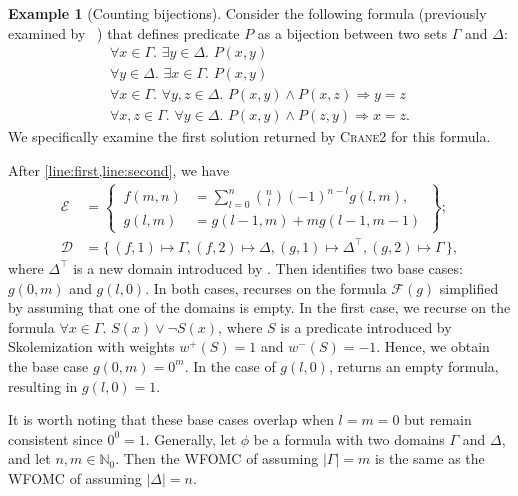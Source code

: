\documentclass[letterpaper]{article} %
\theoremstyle{remark}
\theoremstyle{definition}
\newtheorem{example}{Example}
\newcommand{\Cranetwo}{\textsc{Crane2}}
\begin{document}
\begin{example}[Counting bijections]\label{example:overall}
  Consider the following formula (previously examined by
  \citeauthor{DBLP:conf/kr/DilkasB23}~) that
  defines predicate $P$ as a bijection between two sets $\Gamma$ and $\Delta$:
  \[
    \begin{gathered}
      \forall x \in \Gamma\text{. }\exists y \in \Delta\text{. }P(x, y)\\
      \forall y \in \Delta\text{. }\exists x \in \Gamma\text{. }P(x, y)\\
      \forall x \in \Gamma\text{. }\forall y, z \in \Delta\text{. }P(x, y) \land P(x, z) \Rightarrow y = z\\
      \forall x, z \in \Gamma\text{. }\forall y \in \Delta\text{. }P(x, y) \land P(z, y) \Rightarrow x = z.
    \end{gathered}
  \]
  We specifically examine the first solution returned by \Cranetwo{} for this
  formula.

  After \cref{line:first,line:second}, we have
  \begin{align*}
    \mathcal{E} &= \left\{\,\begin{aligned}f(m, n) &= \sum_{l=0}^{n} \binom{n}{l}{(-1)}^{n-l}g(l, m),\\ g(l, m) &= g(l-1, m) + mg(l-1, m-1)\end{aligned}\,\right\};\\
    \mathcal{D} &= \{\, (f, 1) \mapsto \Gamma, (f, 2) \mapsto \Delta, (g, 1) \mapsto \Delta^{\top}, (g, 2) \mapsto \Gamma \,\},
  \end{align*}
  where $\Delta^{\top}$ is a new domain introduced by \Compile. Then
  \FindBaseCases identifies two base cases: $g(0, m)$ and $g(l, 0)$. In both
  cases, \CompileWithBaseCases recurses on the formula $\mathcal{F}(g)$
  simplified by assuming that one of the domains is empty. In the first case, we
  recurse on the formula $\forall x \in \Gamma\text{. }S(x) \lor \neg S(x)$,
  where $S$ is a predicate introduced by Skolemization with weights
  $w^{+}(S) = 1$ and $w^{-}(S) = -1$. Hence, we obtain the base case
  $g(0, m) = 0^{m}$. In the case of $g(l, 0)$, 
  returns an empty formula, resulting in $g(l, 0) = 1$.
\end{example}

It is worth noting that these base cases overlap when $l = m = 0$ but remain
consistent since $0^{0} = 1$. Generally, let $\phi$ be a formula with two
domains $\Gamma$ and $\Delta$, and let $n, m \in \mathbb{N}_{0}$. Then the WFOMC
of  assuming $|\Gamma| = m$ is the same as the
WFOMC of  assuming $|\Delta| = n$.
\end{document}
